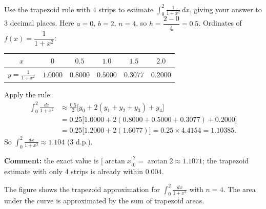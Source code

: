 \documentclass[11pt]{article}
\newcommand{\legende}[1]{\par\vspace{6pt}{\popsemi\fontsize{9}{11.5}\selectfont\color{popmuted}#1}}
\begin{document}
\begin{exoresolu}
Use the trapezoid rule with $4$ strips to estimate $\displaystyle\int_0^2 \frac{1}{1+x^2}\,dx$, giving your answer to 3 decimal places.
\tcblower
Here $a=0$, $b=2$, $n=4$, so $h = \dfrac{2-0}{4} = 0.5$. Ordinates of $f(x)=\dfrac{1}{1+x^2}$:
\begin{center}
\begin{tabular}{|c|ccccc|}
\hline
\rowcolor{popblueL} $x$ & $0$ & $0.5$ & $1.0$ & $1.5$ & $2.0$ \\
\hline
$y=\frac{1}{1+x^2}$ & $1.0000$ & $0.8000$ & $0.5000$ & $0.3077$ & $0.2000$ \\
\hline
\end{tabular}
\end{center}
Apply the rule:
\begin{align*}
\int_0^2\frac{dx}{1+x^2} &\approx \frac{0.5}{2}\Big[y_0 + 2(y_1+y_2+y_3) + y_4\Big] \\
&= 0.25\Big[1.0000 + 2(0.8000 + 0.5000 + 0.3077) + 0.2000\Big] \\
&= 0.25\Big[1.2000 + 2(1.6077)\Big] = 0.25 \times 4.4154 = 1.10385.
\end{align*}
So $\displaystyle\int_0^2\frac{dx}{1+x^2} \approx 1.104$ (3 d.p.).

\textbf{Comment:} the exact value is $\big[\arctan x\big]_0^2 = \arctan 2 \approx 1.1071$; the trapezoid estimate with only 4 strips is already within $0.004$.
\end{exoresolu}

\begin{experience}
The figure shows the trapezoid approximation for $\int_0^2 \frac{dx}{1+x^2}$ with $n=4$. The area under the curve is approximated by the sum of trapezoid areas.
\begin{popfigure}
\legende{Trapezoid rule with $n=4$ strips.}
\end{popfigure}
\end{experience}
\end{document}
